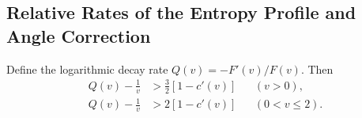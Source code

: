 \subsection{Relative Rates of the Entropy Profile and Angle Correction}
\label{app:profile-angle-rates}

\begin{appendixlemma}
\label{lem:profile-angle-rates}
Define the logarithmic decay rate \(Q(v)=-F'(v)/F(v)\). Then
\begin{equation}
 \begin{aligned}
 Q(v)-\frac1v&>\frac32[1-c'(v)]&& (v>0),\\
 Q(v)-\frac1v&>2[1-c'(v)]&& (0<v\le2).
 \end{aligned}
 \label{eq:middle-profile-angle-rates}
\end{equation}
\end{appendixlemma}

